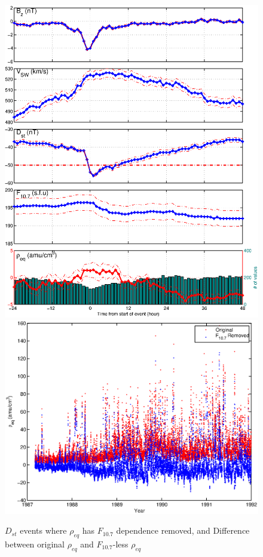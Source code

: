 \documentclass[10pt,twocolumn]{article}
\begin{document}
\begin{figure}[htp!]
\centering
\includegraphics[scale=0.45]{paperfigures/stormavs-dst-nof107.eps}
\includegraphics[scale=0.5]{paperfigures/f107removed.eps}
\caption{$D_{st}$ events where $\rho_{eq}$ has $F_{10.7}$ dependence removed, and Difference between original $\rho_{eq}$ and $F_{10.7}$-less $\rho_{eq}$}
\label{nof107}
\end{figure}
\clearpage
\end{document}
